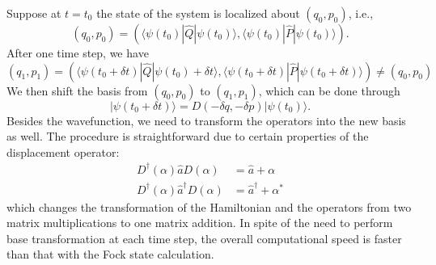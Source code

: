 \documentclass[12pt]{wlscirep}
\begin{document}
Suppose at $t=t_0$ the state of the system is localized about $(q_0,p_0)$, 
i.e.,
\begin{equation*}
    (q_0,p_0)=(\langle\psi(t_0)|\hat{Q}|\psi(t_0)\rangle,\langle\psi(t_0)
    |\hat{P}|\psi(t_0)\rangle).
\end{equation*}
After one time step, we have
\begin{equation*}
    (q_1,p_1)=(\langle\psi(t_0+\delta t)|\hat{Q}|\psi(t_0)+\delta 
        t\rangle,\langle\psi(t_0+\delta t)|\hat{P}|\psi(t_0
    +\delta t)\rangle)\ne(q_0,p_0)
\end{equation*}
We then shift the basis from $(q_0,p_0)$ to $(q_1,p_1)$, which can be
done through
\begin{equation*} \label{eq.delta}
    |\psi(t_0+\delta t)\rangle=D(-\delta q,-\delta p)|\psi(t_0)\rangle.
\end{equation*}
Besides the wavefunction, we need to transform the operators into the new
basis as well. The procedure is straightforward due to certain properties 
of the displacement operator:
\begin{equation*}
    \begin{split}
    D^\dagger(\alpha)\hat{a}D(\alpha)&=\hat{a}+\alpha \\
    D^\dagger(\alpha)\hat{a}^\dagger D(\alpha)&=\hat{a}^\dagger+\alpha^*
\end{split}
\end{equation*}
which changes the transformation of the Hamiltonian and the operators from 
two matrix multiplications to one matrix addition. In spite of the need 
to perform base transformation at each time step, the overall computational
speed is faster than that with the Fock state calculation.

%
%
\end{document}
